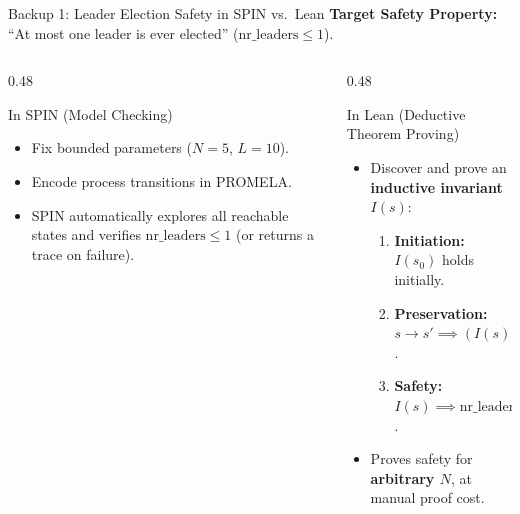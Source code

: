 \documentclass[aspectratio=169]{beamer}
\begin{document}
\begin{frame}[label=backup1]{Backup 1: Leader Election Safety in SPIN vs.\ Lean}
  \textbf{Target Safety Property:} ``At most one leader is ever elected'' ($\text{nr\_leaders} \le 1$).
  \vspace{0.5em}
  \begin{columns}[T]
    \begin{column}{0.48\textwidth}
      \begin{block}{In SPIN (Model Checking)}
        \begin{itemize}
          \item Fix bounded parameters ($N = 5$, $L = 10$).
          \item Encode process transitions in PROMELA.
          \item SPIN automatically explores all reachable states and verifies $\text{nr\_leaders} \le 1$ (or returns a trace on failure).
        \end{itemize}
      \end{block}
    \end{column}
    \begin{column}{0.48\textwidth}
      \begin{block}{In Lean (Deductive Theorem Proving)}
        \begin{itemize}
          \item Discover and prove an \textbf{inductive invariant} $I(s)$:
          \begin{enumerate}
            \item \textbf{Initiation:} $I(s_0)$ holds initially.
            \item \textbf{Preservation:} $s \to s' \implies (I(s) \implies I(s'))$.
            \item \textbf{Safety:} $I(s) \implies \text{nr\_leaders}(s) \le 1$.
          \end{enumerate}
          \item Proves safety for \textbf{arbitrary $N$}, at manual proof cost.
        \end{itemize}
      \end{block}
    \end{column}
  \end{columns}
  \vspace{1.0em}
  \hfill\hyperlink{qa}{}
\end{frame}
\end{document}
